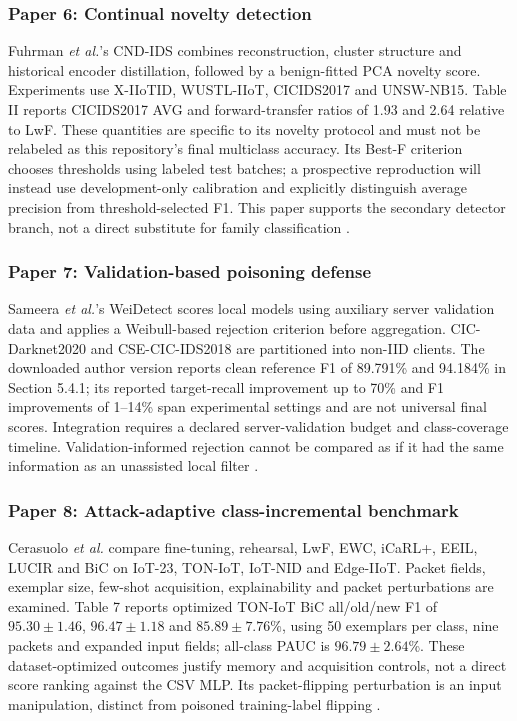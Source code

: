 \documentclass[10pt,a4paper]{article}
\begin{document}
\subsubsection{Paper 6: Continual novelty detection}
Fuhrman \emph{et al.}'s CND-IDS combines reconstruction, cluster structure and historical encoder distillation, followed by a benign-fitted PCA novelty score. Experiments use X-IIoTID, WUSTL-IIoT, CICIDS2017 and UNSW-NB15. Table II reports CICIDS2017 AVG and forward-transfer ratios of 1.93 and 2.64 relative to LwF. These quantities are specific to its novelty protocol and must not be relabeled as this repository's final multiclass accuracy. Its Best-F criterion chooses thresholds using labeled test batches; a prospective reproduction will instead use development-only calibration and explicitly distinguish average precision from threshold-selected F1. This paper supports the secondary detector branch, not a direct substitute for family classification \cite{cnd}.

\subsubsection{Paper 7: Validation-based poisoning defense}
Sameera \emph{et al.}'s WeiDetect scores local models using auxiliary server validation data and applies a Weibull-based rejection criterion before aggregation. CIC-Darknet2020 and CSE-CIC-IDS2018 are partitioned into non-IID clients. The downloaded author version reports clean reference F1 of 89.791\% and 94.184\% in Section 5.4.1; its reported target-recall improvement up to 70\% and F1 improvements of 1--14\% span experimental settings and are not universal final scores. Integration requires a declared server-validation budget and class-coverage timeline. Validation-informed rejection cannot be compared as if it had the same information as an unassisted local filter \cite{wei}.

\subsubsection{Paper 8: Attack-adaptive class-incremental benchmark}
Cerasuolo \emph{et al.} compare fine-tuning, rehearsal, LwF, EWC, iCaRL+, EEIL, LUCIR and BiC on IoT-23, TON-IoT, IoT-NID and Edge-IIoT. Packet fields, exemplar size, few-shot acquisition, explainability and packet perturbations are examined. Table 7 reports optimized TON-IoT BiC all/old/new F1 of $95.30\pm1.46$, $96.47\pm1.18$ and $85.89\pm7.76$\%, using 50 exemplars per class, nine packets and expanded input fields; all-class PAUC is $96.79\pm2.64$\%. These dataset-optimized outcomes justify memory and acquisition controls, not a direct score ranking against the CSV MLP. Its packet-flipping perturbation is an input manipulation, distinct from poisoned training-label flipping \cite{cerasuolo}.
\end{document}
